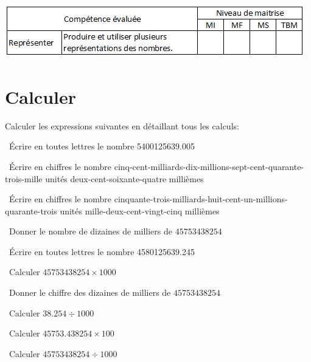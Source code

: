 	\includegraphics[scale=0.95]{competences}

\section{Calculer}
Calculer les expressions suivantes en détaillant tous les calculs:
\begin{questions}
	
	\question[1]  \'Ecrire en toutes lettres le nombre \num{5400125639.005}
	
	\fillwithdottedlines{2cm}
	
	
	\question[1]  \'Ecrire en chiffres le nombre cinq-cent-milliards-dix-millions-sept-cent-quarante-trois-mille unités deux-cent-soixante-quatre millièmes
	
	\fillwithdottedlines{2cm}
	
	
	\question[1]  \'Ecrire en chiffres le nombre cinquante-trois-milliards-huit-cent-un-millions-quarante-trois unités mille-deux-cent-vingt-cinq millièmes
	
	\fillwithdottedlines{2cm}
	
	\question[1]  Donner le nombre de dizaines de milliers de $\num{45753438254}$
	
	\fillwithdottedlines{2cm}
	
	\question[1]  \'Ecrire en toutes lettres le nombre \num{4580125639.245}
	
	\fillwithdottedlines{2cm}
	
	
	\newpage
	
	\question[1]  Calculer $\num{45753438254} \times 1000$
	
	\fillwithdottedlines{2cm}
	
	\question[1]  Donner le chiffre des dizaines de milliers de $\num{45753438254}$
	
	\fillwithdottedlines{2cm}
	
	
	
	
	
	\question[1]  Calculer $\num{38.254} \div 1000$
	
	\fillwithdottedlines{2cm}
	
	
	\question[1]  Calculer $\num{45753.438254} \times 100$
	
	\fillwithdottedlines{2cm}
	
	\question[1]  Calculer $\num{45753438254} \div 1000$
	
	\fillwithdottedlines{2cm}
\end{questions}


